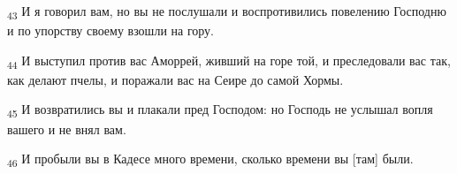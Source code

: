 \begin{tcolorbox}
\textsubscript{43} И я говорил вам, но вы не послушали и воспротивились повелению Господню и по упорству своему взошли на гору.
\end{tcolorbox}
\begin{tcolorbox}
\textsubscript{44} И выступил против вас Аморрей, живший на горе той, и преследовали вас так, как делают пчелы, и поражали вас на Сеире до самой Хормы.
\end{tcolorbox}
\begin{tcolorbox}
\textsubscript{45} И возвратились вы и плакали пред Господом: но Господь не услышал вопля вашего и не внял вам.
\end{tcolorbox}
\begin{tcolorbox}
\textsubscript{46} И пробыли вы в Кадесе много времени, сколько времени вы [там] были.
\end{tcolorbox}
